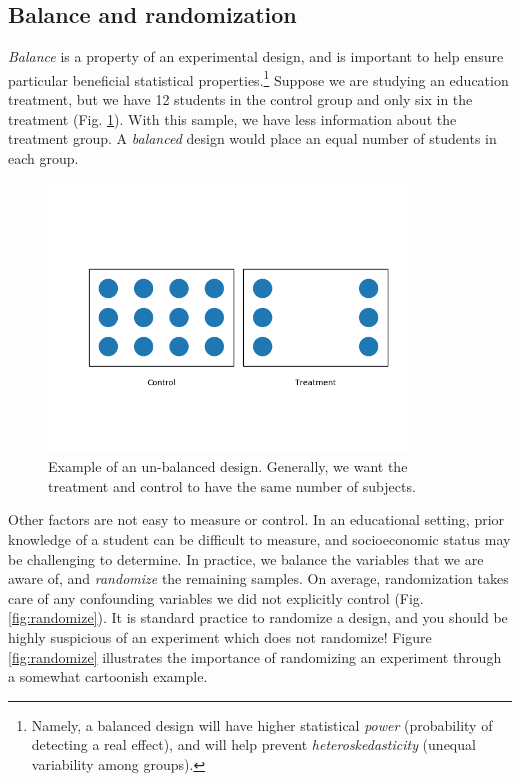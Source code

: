 \documentclass{tufte-handout}
\begin{document}
\subsection{Balance and randomization}
\label{sec:orge2ee824}
\emph{Balance} is a property of an experimental design, and is important to help
ensure particular beneficial statistical properties.\footnote{Namely, a balanced
design will have higher statistical \emph{power} (probability of detecting a real
effect), and will help prevent \emph{heteroskedasticity} (unequal variability among
groups).} Suppose we are studying an education treatment, but we have 12
students in the control group and only six in the treatment (Fig.
\ref{fig:unbalanced}). With this sample, we have less information about the
treatment group. A \emph{balanced} design would place an equal number of students in
each group.

\begin{figure}[!ht]
  \centering
  \includegraphics[width=0.85\textwidth]{images/balance}
  \caption{Example of an un-balanced design. Generally, we want the treatment
  and control to have the same number of subjects.}
  \label{fig:unbalanced}
\end{figure}

Other factors are not easy to measure or control. In an educational setting,
prior knowledge of a student can be difficult to measure, and socioeconomic
status may be challenging to determine. In practice, we balance the variables
that we are aware of, and \emph{randomize} the remaining samples. On average,
randomization takes care of any confounding variables we did not explicitly
control (Fig. \ref{fig:randomize}). It is standard practice to randomize a
design, and you should be highly suspicious of an experiment which does not
randomize! Figure \ref{fig:randomize} illustrates the importance of randomizing
an experiment through a somewhat cartoonish example.
\end{document}
